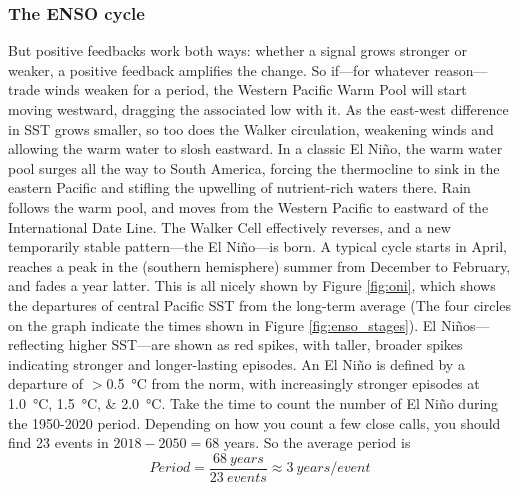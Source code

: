 {\subsubsection{The ENSO cycle} \label{enso_cycle}
But positive feedbacks work both ways: whether a signal grows stronger or weaker, a positive feedback amplifies the change. So if---for whatever reason---trade winds weaken for a period, the Western Pacific Warm Pool will start moving westward, dragging the associated low with it. As the east-west difference in SST grows smaller, so too does the Walker circulation, weakening winds and allowing the warm water to slosh eastward. In a classic El Ni\~no, the warm water pool surges all the way to South America, forcing the thermocline to sink in the eastern Pacific and stifling the upwelling of nutrient-rich waters there. Rain follows the warm pool, and moves from the Western Pacific to eastward of the International Date Line. The Walker Cell effectively reverses, and a new temporarily stable pattern---the El Ni\~no---is born. A typical cycle starts in April, reaches a peak in the (southern hemisphere) summer from December to February, and fades a year latter. This is all nicely shown by Figure \ref{fig:oni}, which shows the departures of central Pacific SST from the long-term average (The four circles on the graph indicate the times shown in Figure \ref{fig:enso_stages}). El Ni\~nos---reflecting higher SST---are shown as red spikes, with taller, broader spikes indicating stronger and longer-lasting episodes. An El Ni\~no is defined by a departure of $>$\SI{0.5}{\celsius} from the norm, with increasingly stronger episodes at \SIlist{1.0; 1.5; 2.0}{\celsius}. Take the time to count the number of El Ni\~no during the 1950-2020 period. Depending on how you count a few close calls, you should find 23 events in $2018-2050=68$ years. So the average period is
\begin{equation}
	Period=\frac{68\ years}{23\ events}\approx 3\ years/event
\end{equation}
}
